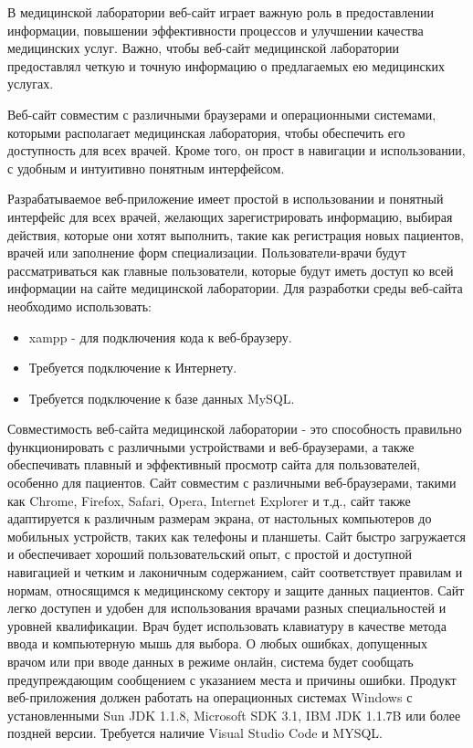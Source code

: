 В медицинской лаборатории веб-сайт играет важную роль в предоставлении информации, повышении эффективности процессов и улучшении качества медицинских услуг. Важно, чтобы веб-сайт медицинской лаборатории предоставлял четкую и точную информацию о предлагаемых ею медицинских услугах. 

Веб-сайт совместим с различными браузерами и операционными системами, которыми располагает медицинская лаборатория, чтобы обеспечить его доступность для всех врачей. Кроме того, он прост в навигации и использовании, с удобным и интуитивно понятным интерфейсом.

Разрабатываемое веб-приложение имеет простой в использовании и понятный интерфейс для всех врачей, желающих зарегистрировать информацию, выбирая действия, которые они хотят выполнить, такие как регистрация новых пациентов, врачей или заполнение форм специализации.  Пользователи-врачи будут рассматриваться как главные пользователи, которые будут иметь доступ ко всей информации на сайте медицинской лаборатории. 
Для разработки среды веб-сайта необходимо использовать:

\begin{itemize}
	\item xampp - для подключения кода к веб-браузеру.
	\item Требуется подключение к Интернету.
	\item Требуется подключение к базе данных MySQL.
\end{itemize}

Совместимость веб-сайта медицинской лаборатории - это способность правильно функционировать с различными устройствами и веб-браузерами, а также обеспечивать плавный и эффективный просмотр сайта для пользователей, особенно для пациентов.
Сайт совместим с различными веб-браузерами, такими как Chrome, Firefox, Safari, Opera, Internet Explorer и т.д., сайт также адаптируется к различным размерам экрана, от настольных компьютеров до мобильных устройств, таких как телефоны и планшеты.
Сайт быстро загружается и обеспечивает хороший пользовательский опыт, с простой и доступной навигацией и четким и лаконичным содержанием, сайт соответствует правилам и нормам, относящимся к медицинскому сектору и защите данных пациентов.
Сайт легко доступен и удобен для использования врачами разных специальностей и уровней квалификации.
Врач будет использовать клавиатуру в качестве метода ввода и компьютерную мышь для выбора. О любых ошибках, допущенных врачом или при вводе данных в режиме онлайн, система будет сообщать предупреждающим сообщением с указанием места и причины ошибки. Продукт веб-приложения должен работать на операционных системах Windows с установленными Sun JDK 1.1.8, Microsoft SDK 3.1, IBM JDK 1.1.7B или более поздней версии. Требуется наличие Visual Studio Code и MYSQL.


